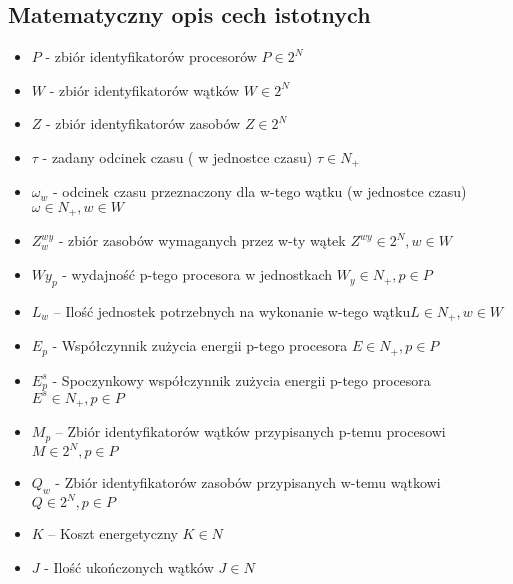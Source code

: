 \documentclass[a4paper,12pt]{extarticle}
\newcommand{\dolGora}[2]{
    _{#1}^{#2}
}
\begin{document}
    \subsection{Matematyczny opis cech istotnych}
        \begin{itemize}
            \item	$P$ -  zbiór identyfikatorów procesorów $P \in 2^N$
            \item	$W$ -  zbiór identyfikatorów wątków $W \in 2^N$
            \item	$Z$ -  zbiór identyfikatorów zasobów $Z \in 2^N$
            \item   $\tau$ - zadany odcinek czasu ( w jednostce czasu) $\tau \in N_+$
            \item   $\omega_w$ - odcinek czasu przeznaczony dla w-tego wątku (w jednostce czasu) $\omega \in N_+, w \in W $ 
            \item   $Z^{wy}_w$ - zbiór zasobów wymaganych przez w-ty wątek $Z^{wy} \in 2^N, w \in W $
            \item	${Wy_{p}}$ - wydajność p-tego procesora w jednostkach $W_y \in N_+, p \in P$
            \item	$L_w$ – Ilość jednostek potrzebnych na wykonanie w-tego wątku$L \in N_+, w \in W$
            \item	$E_p$ - Współczynnik zużycia energii p-tego procesora $E \in N_+ , p \in P$
            \item   $E\dolGora{p}{s}$ - Spoczynkowy współczynnik zużycia energii p-tego procesora $E^s \in N_+ , p \in P$
            \item	$M_{p}$ – Zbiór identyfikatorów wątków przypisanych p-temu procesowi $M \in 2^N, p \in P$
            \item   $Q_{w}$ - Zbiór identyfikatorów zasobów przypisanych w-temu wątkowi $Q \in 2^N, p \in P$
            \item	$K$ – Koszt energetyczny $K \in N$
            \item   $J$ - Ilość ukończonych wątków $J \in N$
        \end{itemize}   

\newpage
\end{document}
